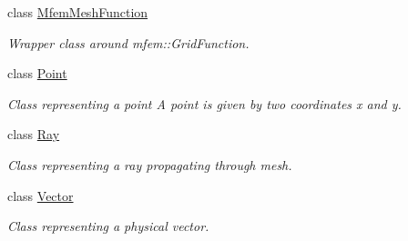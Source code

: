 \begin{DoxyCompactItemize}
class \hyperlink{classraytracer_1_1geometry_1_1MfemMeshFunction}{Mfem\+Mesh\+Function}
\begin{DoxyCompactList}\small\item\em Wrapper class around mfem\+::\+Grid\+Function. \end{DoxyCompactList}\item 
class \hyperlink{classraytracer_1_1geometry_1_1Point}{Point}
\begin{DoxyCompactList}\small\item\em Class representing a point A point is given by two coordinates x and y. \end{DoxyCompactList}\item 
class \hyperlink{classraytracer_1_1geometry_1_1Ray}{Ray}
\begin{DoxyCompactList}\small\item\em Class representing a ray propagating through mesh. \end{DoxyCompactList}\item 
class \hyperlink{classraytracer_1_1geometry_1_1Vector}{Vector}
\begin{DoxyCompactList}\small\item\em Class representing a physical vector. \end{DoxyCompactList}\end{DoxyCompactItemize}
